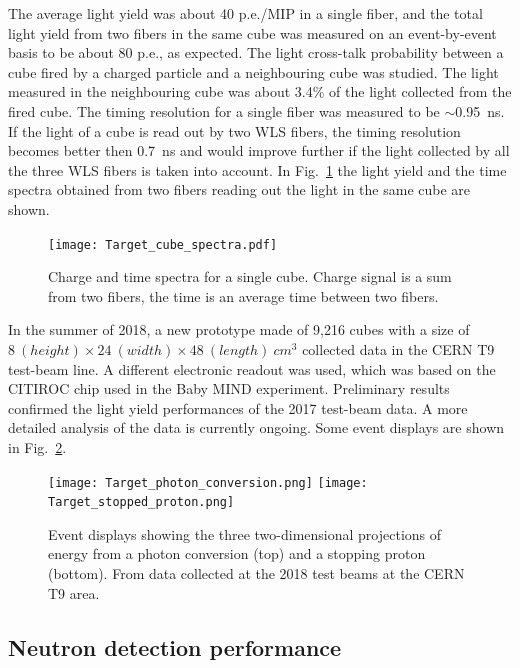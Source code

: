 The average light yield was about 40 p.e./MIP in a single fiber, and the total light yield from two fibers in the same cube was measured on an event-by-event basis to be about 80 p.e., as expected.
The light cross-talk probability between a cube fired by a charged particle and a neighbouring cube was studied. The light measured in the neighbouring cube was about 3.4\% of the light collected from the fired cube. 
The timing resolution for a single fiber was measured to be $\sim$0.95~ns. If the light of a cube is read out by two WLS fibers, the timing resolution becomes better then 0.7~ns and would improve further if the light collected by all the three WLS fibers is taken into account.
In Fig.~\ref{fig:testbeam2017} the light yield and the time spectra obtained from two fibers reading out the light in the same cube are shown.

\begin{figure}
\begin{center}
  \texttt{[image: Target\_cube\_spectra.pdf]}
\caption{\label{fig:testbeam2017} Charge and time spectra for a single cube. Charge signal is a sum from two fibers, the time is an average time between two fibers.} 
\end{center}
\end{figure}

In the summer of 2018, a new prototype made of 9,216 cubes with a size of $8 ~(height) \times 24~(width) \times 48~(length)~\textit{cm}^3$ collected data in the CERN T9 test-beam line.
A different electronic readout was used, which was based on the CITIROC chip used in the Baby MIND experiment.
Preliminary results confirmed the light yield performances of the 2017 test-beam data. A more detailed analysis of the data is currently ongoing.
Some event displays are shown in Fig.~\ref{fig:testbeam2018}.

\begin{figure}
\begin{center}
\texttt{[image: Target\_photon\_conversion.png]}
\texttt{[image: Target\_stopped\_proton.png]}
\caption{\label{fig:testbeam2018} Event displays showing the three two-dimensional projections of energy from a photon conversion (top) and a stopping proton (bottom). From data collected at the 2018 test beams at the CERN T9 area.} 
\end{center}
\end{figure}



\subsection{Neutron detection performance}

